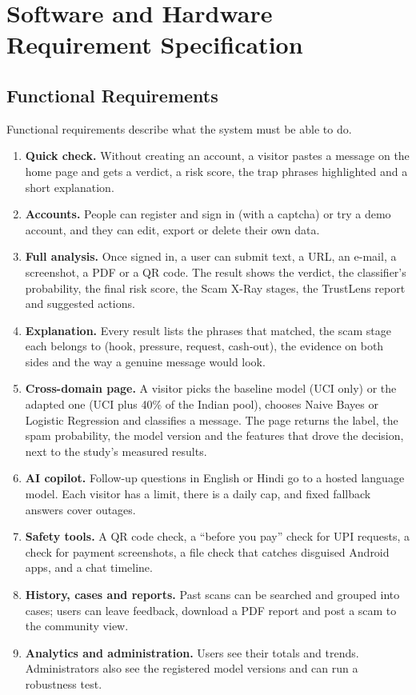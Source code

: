 \chapter{Software and Hardware Requirement Specification}
\section{Functional Requirements}\label{sec:funcreq}
Functional requirements describe what the system must be able to do.
\begin{enumerate}
\item \textbf{Quick check.} Without creating an account, a visitor pastes a message on the home page and gets a verdict, a risk score, the trap phrases highlighted and a short explanation.
\item \textbf{Accounts.} People can register and sign in (with a captcha) or try a demo account, and they can edit, export or delete their own data.
\item \textbf{Full analysis.} Once signed in, a user can submit text, a URL, an e-mail, a screenshot, a PDF or a QR code. The result shows the verdict, the classifier's probability, the final risk score, the Scam X-Ray stages, the TrustLens report and suggested actions.
\item \textbf{Explanation.} Every result lists the phrases that matched, the scam stage each belongs to (hook, pressure, request, cash-out), the evidence on both sides and the way a genuine message would look.
\item \textbf{Cross-domain page.} A visitor picks the baseline model (UCI only) or the adapted one (UCI plus 40\% of the Indian pool), chooses Naive Bayes or Logistic Regression and classifies a message. The page returns the label, the spam probability, the model version and the features that drove the decision, next to the study's measured results.
\item \textbf{AI copilot.} Follow-up questions in English or Hindi go to a hosted language model. Each visitor has a limit, there is a daily cap, and fixed fallback answers cover outages.
\item \textbf{Safety tools.} A QR code check, a ``before you pay'' check for UPI requests, a check for payment screenshots, a file check that catches disguised Android apps, and a chat timeline.
\item \textbf{History, cases and reports.} Past scans can be searched and grouped into cases; users can leave feedback, download a PDF report and post a scam to the community view.
\item \textbf{Analytics and administration.} Users see their totals and trends. Administrators also see the registered model versions and can run a robustness test.
\end{enumerate}

